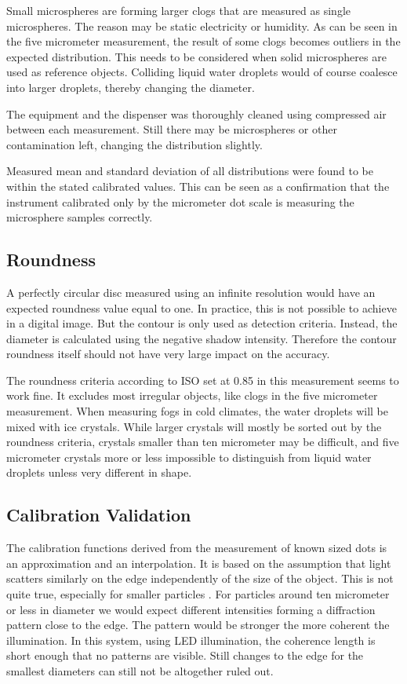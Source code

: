 Small microspheres are forming larger clogs that are measured as single microspheres. The reason may be static electricity or humidity. As can be seen in the five micrometer measurement, the result of some clogs becomes outliers in the expected distribution. This needs to be considered when solid microspheres are used as reference objects. Colliding liquid water droplets would of course coalesce into larger droplets, thereby changing the diameter.

The equipment and the dispenser was thoroughly cleaned using compressed air between each measurement. Still there may be microspheres or other contamination left, changing the distribution slightly.

Measured mean and standard deviation of all distributions were found to be within the stated calibrated values. This can be seen as a confirmation that the instrument calibrated only by the micrometer dot scale is measuring the microsphere samples correctly.

\subsection{Roundness}

A perfectly circular disc measured using an infinite resolution would have an expected roundness value equal to one. In practice, this is not possible to achieve in a digital image. But the contour is only used as detection criteria. Instead, the diameter is calculated using the negative shadow intensity. Therefore the contour roundness itself should not have very large impact on the accuracy.

The roundness criteria according to ISO \cite{iso12181} set at 0.85 in this measurement seems to work fine. It excludes most irregular objects, like clogs in the five micrometer measurement. When measuring fogs in cold climates, the water droplets will be mixed with ice crystals. While larger crystals will mostly be sorted out by the roundness criteria, crystals smaller than ten micrometer may be difficult, and five micrometer crystals more or less impossible to distinguish from liquid water droplets unless very different in shape.

\subsection{Calibration Validation}

The calibration functions derived from the measurement of known sized dots is an approximation and an interpolation. It is based on the assumption that light scatters similarly on the edge independently of the size of the object. This is not quite true, especially for smaller particles \cite{bohr2008}. For particles around ten micrometer or less in diameter we would expect different intensities forming a diffraction pattern close to the edge. The pattern would be stronger the more coherent the illumination. In this system, using LED illumination, the coherence length is short enough that no patterns are visible. Still changes to the edge for the smallest diameters can still not be altogether ruled out.

